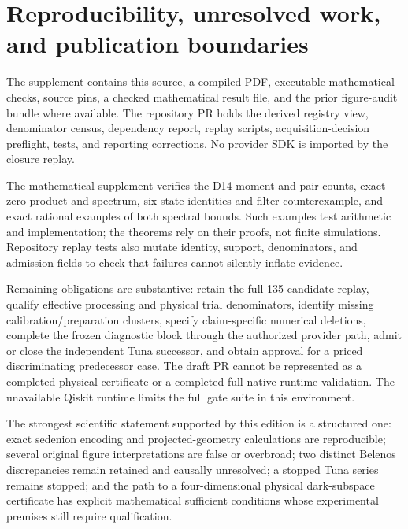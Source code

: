 \documentclass[11pt,a4paper]{article}
\begin{document}
\section{Reproducibility, unresolved work, and publication boundaries}
The supplement contains this source, a compiled PDF, executable mathematical checks, source pins, a checked mathematical result file, and the prior figure-audit bundle where available. The repository PR holds the derived registry view, denominator census, dependency report, replay scripts, acquisition-decision preflight, tests, and reporting corrections. No provider SDK is imported by the closure replay.

The mathematical supplement verifies the D14 moment and pair counts, exact zero product and spectrum, six-state identities and filter counterexample, and exact rational examples of both spectral bounds. Such examples test arithmetic and implementation; the theorems rely on their proofs, not finite simulations. Repository replay tests also mutate identity, support, denominators, and admission fields to check that failures cannot silently inflate evidence.

Remaining obligations are substantive: retain the full 135-candidate replay, qualify effective processing and physical trial denominators, identify missing calibration/preparation clusters, specify claim-specific numerical deletions, complete the frozen diagnostic block through the authorized provider path, admit or close the independent Tuna successor, and obtain approval for a priced discriminating predecessor case. The draft PR cannot be represented as a completed physical certificate or a completed full native-runtime validation. The unavailable Qiskit runtime limits the full gate suite in this environment.

The strongest scientific statement supported by this edition is a structured one: exact sedenion encoding and projected-geometry calculations are reproducible; several original figure interpretations are false or overbroad; two distinct Belenos discrepancies remain retained and causally unresolved; a stopped Tuna series remains stopped; and the path to a four-dimensional physical dark-subspace certificate has explicit mathematical sufficient conditions whose experimental premises still require qualification.

\appendix
\end{document}

